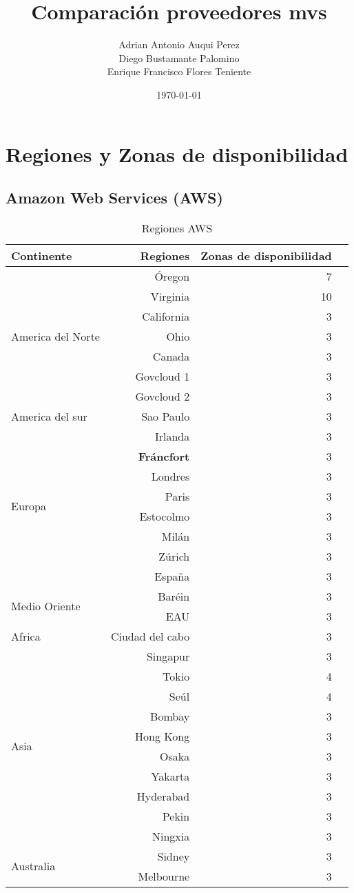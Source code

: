 \documentclass{article}
\title{Comparación proveedores mvs}
\date{\today}
\author{
    Adrian Antonio Auqui Perez \\
    Diego Bustamante Palomino \\
    Enrique Francisco Flores Teniente
  }
\affil{UTEC}
\begin{document}
\maketitle

\section{Regiones y Zonas de disponibilidad}

\subsection{Amazon Web Services (AWS)}

\begin{table}[!htp]\centering
\caption{Regiones AWS}\label{tab: }
\scriptsize
\begin{tabular}{lrrr}\toprule
Continente &Regiones &Zonas de disponibilidad \\\midrule
\multirow{7}{*}{America del Norte} &Óregon &7 \\
&Virginia &10 \\
&California &3 \\
&Ohio &3 \\
&Canada &3 \\
&Govcloud 1 &3 \\
&Govcloud 2 &3 \\
America del sur &Sao Paulo &3 \\
\multirow{8}{*}{Europa} &Irlanda &3 \\
&\textbf{Fráncfort} &3 \\
&Londres &3 \\
&Paris &3 \\
&Estocolmo &3 \\
&Milán &3 \\
&Zúrich &3 \\
&España &3 \\
\multirow{2}{*}{Medio Oriente} &Baréin &3 \\
&EAU &3 \\
Africa &Ciudad del cabo &3 \\
\multirow{10}{*}{Asia} &Singapur &3 \\
&Tokio &4 \\
&Seúl &4 \\
&Bombay &3 \\
&Hong Kong &3 \\
&Osaka &3 \\
&Yakarta &3 \\
&Hyderabad &3 \\
&Pekin &3 \\
&Ningxia &3 \\
\multirow{2}{*}{Australia} &Sidney &3 \\
&Melbourne &3 \\
\bottomrule
\end{tabular}
\end{table}
\end{document}
